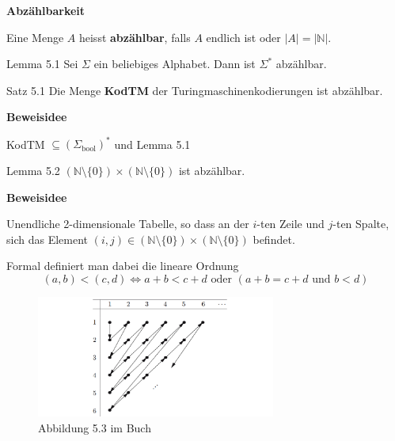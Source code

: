\documentclass[a4paper, 11pt]{article}
\def\N{\mathbb{N}}
\begin{document}
        
        
            \textbf{Abzählbarkeit}
            \begin{mainbox}
                Eine Menge $A$ heisst \textbf{abzählbar}, falls $A$ endlich ist oder $|A| = |\N|$.
            \end{mainbox}
            \begin{subbox}{Lemma 5.1}
            Sei $\Sigma$ ein beliebiges Alphabet. Dann ist $\Sigma^*$ abzählbar.
            \end{subbox}
        
        
            \begin{mainbox}{Satz 5.1}
                Die Menge \textbf{KodTM} der Turingmaschinenkodierungen ist abzählbar.
            \end{mainbox}
            \textbf{Beweisidee}
        
            KodTM $\subseteq (\Sigma_{\text{bool}})^*$ und Lemma 5.1
        
            \begin{mainbox}{Lemma 5.2}
                $(\N\setminus\{0\}) \times (\N \setminus \{0\})$ ist abzählbar.
            \end{mainbox}
            \textbf{Beweisidee}
        
            Unendliche 2-dimensionale Tabelle, so dass an der $i$-ten Zeile und $j$-ten Spalte, sich das Element $(i,j) \in (\N\setminus\{0\}) \times (\N \setminus \{0\})$ befindet.
        
            Formal definiert man dabei die lineare Ordnung 
            $$(a,b) < (c,d) \iff a+b < c+d \text{ oder }(a+b = c+d \text{ und } b <d)$$
        
            \begin{figure}[htp]
                \includegraphics[width=0.7\textwidth]{Images/Abzählen.png}
                \caption{Abbildung 5.3 im Buch}
            \end{figure}
        
\end{document}
